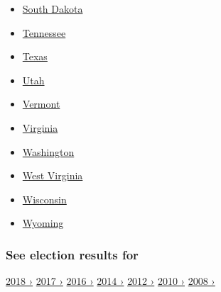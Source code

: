 \begin{itemize}
{  Carolina}
\item
  \href{https://www.nytimes3xbfgragh.onion/interactive/2018/11/06/us/elections/results-south-dakota-elections.html}{South
  Dakota}
\item
  \href{https://www.nytimes3xbfgragh.onion/interactive/2018/11/06/us/elections/results-tennessee-elections.html}{Tennessee}
\item
  \href{https://www.nytimes3xbfgragh.onion/interactive/2018/11/06/us/elections/results-texas-elections.html}{Texas}
\item
  \href{https://www.nytimes3xbfgragh.onion/interactive/2018/11/06/us/elections/results-utah-elections.html}{Utah}
\item
  \href{https://www.nytimes3xbfgragh.onion/interactive/2018/11/06/us/elections/results-vermont-elections.html}{Vermont}
\item
  \href{https://www.nytimes3xbfgragh.onion/interactive/2018/11/06/us/elections/results-virginia-elections.html}{Virginia}
\item
  \href{https://www.nytimes3xbfgragh.onion/interactive/2018/11/06/us/elections/results-washington-elections.html}{Washington}
\item
  \href{https://www.nytimes3xbfgragh.onion/interactive/2018/11/06/us/elections/results-west-virginia-elections.html}{West
  Virginia}
\item
  \href{https://www.nytimes3xbfgragh.onion/interactive/2018/11/06/us/elections/results-wisconsin-elections.html}{Wisconsin}
\item
  \href{https://www.nytimes3xbfgragh.onion/interactive/2018/11/06/us/elections/results-wyoming-elections.html}{Wyoming}
\end{itemize}

\hypertarget{see-election-results-for}{%
\subsubsection{See election results
for}\label{see-election-results-for}}

\href{https://www.nytimes3xbfgragh.onion/interactive/2018/us/elections/calendar-primary-results.html}{2018
›}
\href{https://www.nytimes3xbfgragh.onion/interactive/2017/us/elections/election-calendar.html}{2017
›}
\href{https://www.nytimes3xbfgragh.onion/elections/results/president}{2016
›}
\href{https://www.nytimes3xbfgragh.onion/elections/2014/results/senate}{2014
›}
\href{https://www.nytimes3xbfgragh.onion/elections/2012/results/president.html}{2012
›}
\href{https://www.nytimes3xbfgragh.onion/elections/2010/results/senate.html}{2010
›}
\href{https://www.nytimes3xbfgragh.onion/elections/2008/results/president/map.html}{2008
›}

